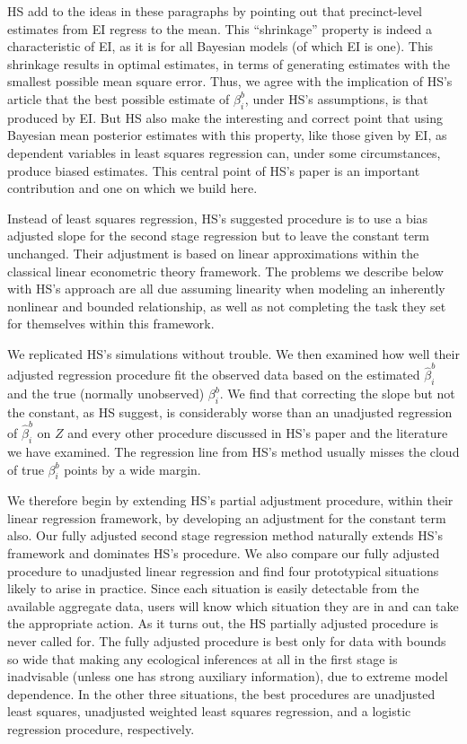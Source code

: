 \documentclass[11pt,titlepage]{article}
\begin{document}
HS add to the ideas in these paragraphs by pointing out that
precinct-level estimates from EI regress to the mean.  This
``shrinkage'' property is indeed a characteristic of EI, as it is for
all Bayesian models (of which EI is one).  This shrinkage results in
optimal estimates, in terms of generating estimates with the smallest
possible mean square error.  Thus, we agree with the implication of
HS's article that the best possible estimate of $\beta^b_i$, under
HS's assumptions, is that produced by EI.  But HS also make the
interesting and correct point that using Bayesian mean posterior
estimates with this property, like those given by EI, as dependent
variables in least squares regression can, under some circumstances,
produce biased estimates.  This central point of HS's paper is an
important contribution and one on which we build here.

Instead of least squares regression, HS's suggested procedure is to
use a bias adjusted slope for the second stage regression but to leave
the constant term unchanged.  Their adjustment is based on linear
approximations within the classical linear econometric theory
framework.  The problems we describe below with HS's approach are all
due assuming linearity when modeling an inherently nonlinear and
bounded relationship, as well as not completing the task they set for
themselves within this framework.

We replicated HS's simulations without trouble.  We then examined how
well their adjusted regression procedure fit the observed data based
on the estimated $\hat\beta_i^b$ and the true (normally unobserved)
$\beta_i^b$.  We find that correcting the slope but not the constant,
as HS suggest, is considerably worse than an unadjusted regression of
$\hat\beta_i^b$ on $Z$ and every other procedure discussed in HS's
paper and the literature we have examined.  The regression line from
HS's method usually misses the cloud of true $\beta_i^b$ points by a
wide margin.

We therefore begin by extending HS's partial adjustment procedure,
within their linear regression framework, by developing an adjustment
for the constant term also.  Our fully adjusted second stage
regression method naturally extends HS's framework and dominates HS's
procedure.  We also compare our fully adjusted procedure to unadjusted
linear regression and find four prototypical situations likely to
arise in practice.  Since each situation is easily detectable from the
available aggregate data, users will know which situation they are in
and can take the appropriate action.  As it turns out, the HS
partially adjusted procedure is never called for.  The fully adjusted
procedure is best only for data with bounds so wide that making any
ecological inferences at all in the first stage is inadvisable (unless
one has strong auxiliary information), due to extreme model
dependence.  In the other three situations, the best procedures are
unadjusted least squares, unadjusted weighted least squares
regression, and a logistic regression procedure, respectively.
\end{document}
